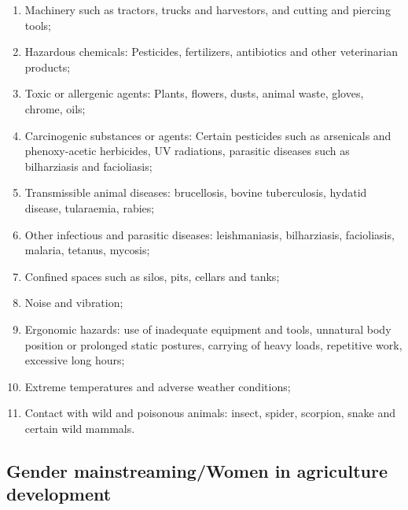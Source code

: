 \documentclass[
  openany]{book}
\providecommand{\tightlist}{%
  \setlength{\itemsep}{0pt}\setlength{\parskip}{0pt}}
\begin{document}
\begin{enumerate}
\def\labelenumi{\arabic{enumi}.}
\tightlist
\item
  Machinery such as tractors, trucks and harvestors, and cutting and piercing tools;
\item
  Hazardous chemicals: Pesticides, fertilizers, antibiotics and other veterinarian products;
\item
  Toxic or allergenic agents: Plants, flowers, dusts, animal waste, gloves, chrome, oils;
\item
  Carcinogenic substances or agents: Certain pesticides such as arsenicals and phenoxy-acetic herbicides, UV radiations, parasitic diseases such as bilharziasis and facioliasis;
\item
  Transmissible animal diseases: brucellosis, bovine tuberculosis, hydatid disease, tularaemia, rabies;
\item
  Other infectious and parasitic diseases: leishmaniasis, bilharziasis, facioliasis, malaria, tetanus, mycosis;
\item
  Confined spaces such as silos, pits, cellars and tanks;
\item
  Noise and vibration;
\item
  Ergonomic hazards: use of inadequate equipment and tools, unnatural body position or prolonged static postures, carrying of heavy loads, repetitive work, excessive long hours;
\item
  Extreme temperatures and adverse weather conditions;
\item
  Contact with wild and poisonous animals: insect, spider, scorpion, snake and certain wild mammals.
\end{enumerate}

\hypertarget{gender-mainstreamingwomen-in-agriculture-development}{%
\subsection{Gender mainstreaming/Women in agriculture development}\label{gender-mainstreamingwomen-in-agriculture-development}}
\end{document}
